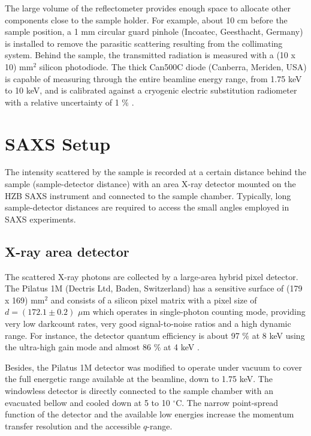 The large volume of the reflectometer provides enough space to allocate other components close to the sample holder. For example, about 10 cm before the sample position, a 1 mm circular guard pinhole (Incoatec, Geesthacht, Germany) is installed to remove the parasitic scattering resulting from the collimating system. Behind the sample, the transmitted radiation is measured with a (10 x 10) mm$^2$ silicon photodiode. The thick Can500C diode (Canberra, Meriden, USA) is capable of measuring through the entire beamline energy range, from 1.75 keV to 10 keV, and is calibrated against a cryogenic electric substitution radiometer with a relative uncertainty of 1 $\%$ \citep{krumrey_high-accuracy_2001}.

\section{SAXS Setup}
\label{sec:SAXS_experimental}

The intensity scattered by the sample is recorded at a certain distance behind the sample (sample-detector distance) with an area X-ray detector mounted on the HZB SAXS instrument and connected to the sample chamber. Typically, long sample-detector distances are required to access the small angles employed in SAXS experiments.

\subsection{X-ray area detector}
\label{sec:pilatus}

The scattered X-ray photons are collected by a large-area hybrid pixel detector. The Pilatus 1M (Dectris Ltd, Baden, Switzerland) has a sensitive surface of (179 x 169) mm$^2$ and consists of a silicon pixel matrix with a pixel size of $d = (172.1 \pm 0.2)$ $\mu$m which operates in single-photon counting mode, providing very low darkcount rates, very good signal-to-noise ratios and a high dynamic range. For instance, the detector quantum efficiency is about 97 $\%$ at 8 keV using the ultra-high gain mode and almost 86 $\%$ at 4 keV \citep{wernecke_characterization_2014}.

Besides, the Pilatus 1M detector was modified to operate under vacuum to cover the full energetic range available at the beamline, down to 1.75 keV. The windowless detector is directly connected to the sample chamber with an evacuated bellow and cooled down at 5 to 10 $^{\circ}$C. The narrow point-spread function of the detector and the available low energies increase the momentum transfer resolution and the accessible $q$-range.

